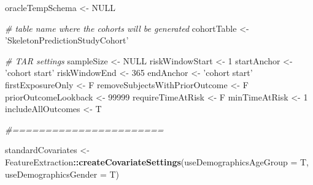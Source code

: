\documentclass[
]{article}
\newenvironment{Shaded}{\begin{snugshade}}{\end{snugshade}}
\newcommand{\CommentTok}[1]{\textcolor[rgb]{0.56,0.35,0.01}{\textit{#1}}}
\newcommand{\DataTypeTok}[1]{\textcolor[rgb]{0.13,0.29,0.53}{#1}}
\newcommand{\DecValTok}[1]{\textcolor[rgb]{0.00,0.00,0.81}{#1}}
\newcommand{\KeywordTok}[1]{\textcolor[rgb]{0.13,0.29,0.53}{\textbf{#1}}}
\newcommand{\NormalTok}[1]{#1}
\newcommand{\OperatorTok}[1]{\textcolor[rgb]{0.81,0.36,0.00}{\textbf{#1}}}
\newcommand{\OtherTok}[1]{\textcolor[rgb]{0.56,0.35,0.01}{#1}}
\newcommand{\StringTok}[1]{\textcolor[rgb]{0.31,0.60,0.02}{#1}}
\begin{document}
\begin{Shaded}
\begin{Highlighting}[]
\NormalTok{  oracleTempSchema <-}\StringTok{ }\OtherTok{NULL}
  
  \CommentTok{# table name where the cohorts will be generated}
\NormalTok{  cohortTable <-}\StringTok{ 'SkeletonPredictionStudyCohort'}
  
  \CommentTok{# TAR settings}
\NormalTok{  sampleSize <-}\StringTok{ }\OtherTok{NULL}
\NormalTok{  riskWindowStart <-}\StringTok{ }\DecValTok{1}
\NormalTok{  startAnchor <-}\StringTok{ 'cohort start'}
\NormalTok{  riskWindowEnd <-}\StringTok{ }\DecValTok{365}
\NormalTok{  endAnchor <-}\StringTok{ 'cohort start'}
\NormalTok{  firstExposureOnly <-}\StringTok{ }\NormalTok{F}
\NormalTok{  removeSubjectsWithPriorOutcome <-}\StringTok{ }\NormalTok{F}
\NormalTok{  priorOutcomeLookback <-}\StringTok{ }\DecValTok{99999}
\NormalTok{  requireTimeAtRisk <-}\StringTok{ }\NormalTok{F}
\NormalTok{  minTimeAtRisk <-}\StringTok{ }\DecValTok{1}
\NormalTok{  includeAllOutcomes <-}\StringTok{ }\NormalTok{T}
  
  
  \CommentTok{#=======================}
  
\NormalTok{  standardCovariates <-}\StringTok{ }\NormalTok{FeatureExtraction}\OperatorTok{::}\KeywordTok{createCovariateSettings}\NormalTok{(}\DataTypeTok{useDemographicsAgeGroup =}\NormalTok{ T, }\DataTypeTok{useDemographicsGender =}\NormalTok{ T)}
  

\end{Highlighting}
\end{Shaded}
\end{document}
